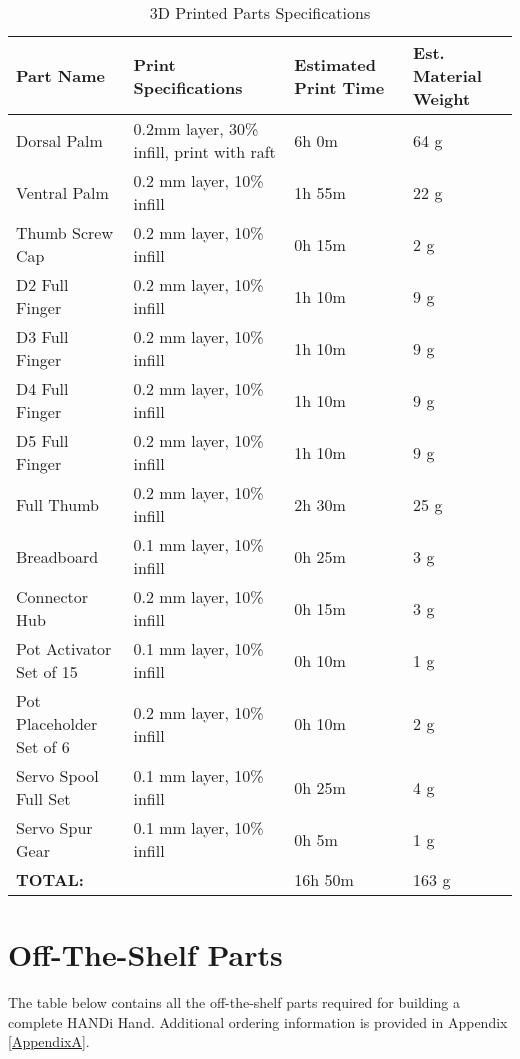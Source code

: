 \begin{table}[H]
\centering
\caption{3D Printed Parts Specifications}
\label{3d_printed_parts_list}
\begin{tabular}{|p{4cm}|p{4cm}|p{2cm}|p{2.5cm}|}
\hline
\textbf{Part Name} & \textbf{Print Specifications} & \textbf{Estimated Print Time} & \textbf{Est. Material Weight} \\ \hline
Dorsal Palm & 0.2mm layer, 30\% infill, print with raft & 6h 0m & 64 g \\ \hline
Ventral Palm & 0.2 mm layer, 10\% infill & 1h 55m & 22 g  \\ \hline
Thumb Screw Cap &0.2 mm layer, 10\% infill &0h 15m &2 g  \\ \hline
D2 Full Finger &0.2 mm layer, 10\% infill &1h 10m &9 g  \\ \hline
D3 Full Finger &0.2 mm layer, 10\% infill &1h 10m &9 g  \\ \hline
D4 Full Finger &0.2 mm layer, 10\% infill &1h 10m &9 g  \\ \hline
D5 Full Finger &0.2 mm layer, 10\% infill &1h 10m &9 g  \\ \hline
Full Thumb &0.2 mm layer, 10\% infill &2h 30m &25 g  \\ \hline
Breadboard &0.1 mm layer, 10\% infill &0h 25m &3 g  \\ \hline
Connector Hub &0.2 mm layer, 10\% infill &0h 15m &3 g  \\ \hline
Pot Activator Set of 15 &0.1 mm layer, 10\% infill &0h 10m &1 g  \\ \hline
Pot Placeholder Set of 6 &0.2 mm layer, 10\% infill &0h 10m &2 g  \\ \hline
Servo Spool Full Set &0.1 mm layer, 10\% infill &0h 25m &4 g  \\ \hline
Servo Spur Gear &0.1 mm layer, 10\% infill &0h 5m &1 g  \\ \hline
\textbf{TOTAL:}&\centering{-}  & 16h 50m & 163 g \\ \hline
\end{tabular}
\end{table} 


\section{Off-The-Shelf Parts}
The table below contains all the off-the-shelf parts required for building a complete HANDi Hand. Additional ordering information is provided in Appendix \ref{AppendixA}.

